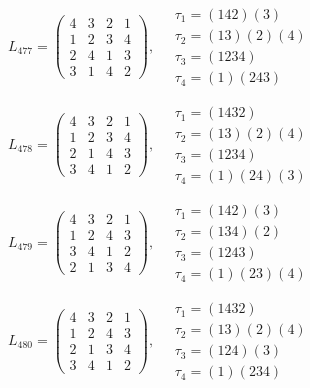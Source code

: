 $L_{477} = \begin{pmatrix} 4 & 3 & 2 & 1 \\ 1 & 2 & 3 & 4 \\ 2 & 4 & 1 & 3 \\ 3 & 1 & 4 & 2 \end{pmatrix}, \quad \begin{matrix} \tau_{1} = (1 4 2)(3) \\ \tau_{2} = (1 3)(2)(4) \\ \tau_{3} = (1 2 3 4) \\ \tau_{4} = (1)(2 4 3) \end{matrix}$

$L_{478} = \begin{pmatrix} 4 & 3 & 2 & 1 \\ 1 & 2 & 3 & 4 \\ 2 & 1 & 4 & 3 \\ 3 & 4 & 1 & 2 \end{pmatrix}, \quad \begin{matrix} \tau_{1} = (1 4 3 2) \\ \tau_{2} = (1 3)(2)(4) \\ \tau_{3} = (1 2 3 4) \\ \tau_{4} = (1)(2 4)(3) \end{matrix}$

$L_{479} = \begin{pmatrix} 4 & 3 & 2 & 1 \\ 1 & 2 & 4 & 3 \\ 3 & 4 & 1 & 2 \\ 2 & 1 & 3 & 4 \end{pmatrix}, \quad \begin{matrix} \tau_{1} = (1 4 2)(3) \\ \tau_{2} = (1 3 4)(2) \\ \tau_{3} = (1 2 4 3) \\ \tau_{4} = (1)(2 3)(4) \end{matrix}$

$L_{480} = \begin{pmatrix} 4 & 3 & 2 & 1 \\ 1 & 2 & 4 & 3 \\ 2 & 1 & 3 & 4 \\ 3 & 4 & 1 & 2 \end{pmatrix}, \quad \begin{matrix} \tau_{1} = (1 4 3 2) \\ \tau_{2} = (1 3)(2)(4) \\ \tau_{3} = (1 2 4)(3) \\ \tau_{4} = (1)(2 3 4) \end{matrix}$

